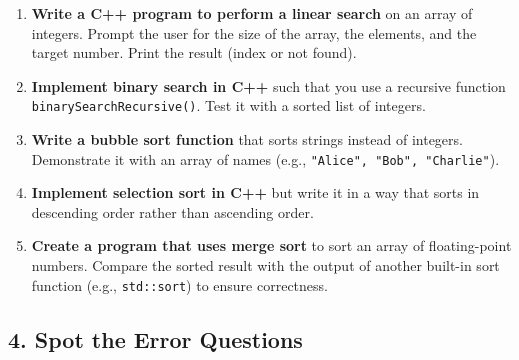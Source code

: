 \documentclass[a4paper,12pt]{article}
\begin{document}
\begin{enumerate}
    \item \textbf{Write a C++ program to perform a linear search} on an array of integers. Prompt the user for the size of the array, the elements, and the target number. Print the result (index or not found).

    \item \textbf{Implement binary search in C++} such that you use a recursive function \texttt{binarySearchRecursive()}. Test it with a sorted list of integers.

    \item \textbf{Write a bubble sort function} that sorts strings instead of integers. Demonstrate it with an array of names (e.g., \texttt{"Alice", "Bob", "Charlie"}).

    \item \textbf{Implement selection sort in C++} but write it in a way that sorts in descending order rather than ascending order.

    \item \textbf{Create a program that uses merge sort} to sort an array of floating-point numbers. Compare the sorted result with the output of another built-in sort function (e.g., \texttt{std::sort}) to ensure correctness.
\end{enumerate}

\subsection{4. Spot the Error Questions}
\end{document}
